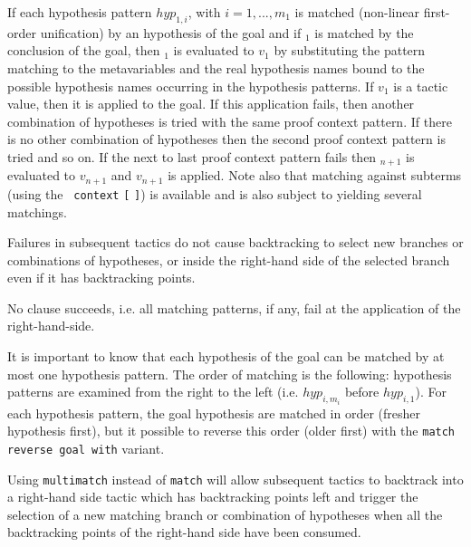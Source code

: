 If each hypothesis pattern $hyp_{1,i}$, with $i=1,...,m_1$
is matched (non-linear first-order unification) by an hypothesis of
the goal and if {\cpattern}$_1$ is matched by the conclusion of the
goal, then {\tacexpr}$_1$ is evaluated to $v_1$ by substituting the
pattern matching to the metavariables and the real hypothesis names
bound to the possible hypothesis names occurring in the hypothesis
patterns. If $v_1$ is a tactic value, then it is applied to the
goal. If this application fails, then another combination of
hypotheses is tried with the same proof context pattern. If there is
no other combination of hypotheses then the second proof context
pattern is tried and so on. If the next to last proof context pattern
fails then {\tacexpr}$_{n+1}$ is evaluated to $v_{n+1}$ and $v_{n+1}$
is applied. Note also that matching against subterms (using the {\tt
context} {\ident} {\tt [} {\cpattern} {\tt ]}) is available and is
also subject to yielding several matchings.

Failures in subsequent tactics do not cause backtracking to select new
branches or combinations of hypotheses, or inside the right-hand side
of the selected branch even if it has backtracking points.

\ErrMsg {}

No clause succeeds, i.e. all matching patterns, if any,
fail at the application of the right-hand-side.

\medskip

It is important to know that each hypothesis of the goal can be
matched by at most one hypothesis pattern. The order of matching is
the following: hypothesis patterns are examined from the right to the
left (i.e. $hyp_{i,m_i}$ before $hyp_{i,1}$). For each hypothesis
pattern, the goal hypothesis are matched in order (fresher hypothesis
first), but it possible to reverse this order (older first) with
the {\tt match reverse goal with} variant.

\variant


Using {\tt multimatch} instead of {\tt match} will allow subsequent
tactics to backtrack into a right-hand side tactic which has
backtracking points left and trigger the selection of a new matching
branch or combination of hypotheses when all the backtracking points
of the right-hand side have been consumed.

